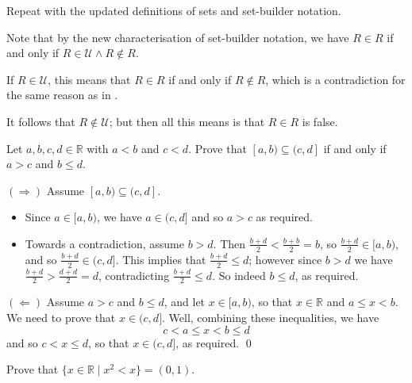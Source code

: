 \begin{exercise}
Repeat  with the updated definitions of sets and set-builder notation.
\end{exercise}

\begin{solutions*}
Note that by the new characterisation of set-builder notation, we have $R \in R$ if and only if $R \in \mathcal{U} \wedge R \not\in R$.

If $R \in \mathcal{U}$, this means that $R \in R$ if and only if $R \not\in R$, which is a contradiction for the same reason as in .

It follows that $R \not\in \mathcal{U}$; but then all this means is that $R \in R$ is false.
\end{solutions*}


\begin{exercise}
Let $a,b,c,d \in \mathbb{R}$ with $a<b$ and $c<d$. Prove that $[a,b) \subseteq (c,d]$ if and only if $a > c$ and $b \le d$.
\end{exercise}

\begin{solutions*}
$(\Rightarrow)$ Assume $[a,b) \subseteq (c,d]$.
\begin{itemize}
\item Since $a \in [a,b)$, we have $a \in (c,d]$ and so $a > c$ as required.
\item Towards a contradiction, assume $b > d$. Then $\frac{b+d}{2} < \frac{b+b}{2} = b$, so $\frac{b+d}{2} \in [a,b)$, and so $\frac{b+d}{2} \in (c,d]$. This implies that $\frac{b+d}{2} \le d$; however since $b>d$ we have $\frac{b+d}{2} > \frac{d+d}{2} = d$, contradicting $\frac{b+d}{2} \le d$. So indeed $b \le d$, as required.
\end{itemize}
$(\Leftarrow)$ Assume $a>c$ and $b \le d$, and let $x \in [a,b)$, so that $x \in \mathbb{R}$ and $a \le x < b$. We need to prove that $x \in (c,d]$. Well, combining these inequalities, we have
\[ c < a \le x < b \le d \]
and so $c < x \le d$, so that $x \in (c,d]$, as required. \qed
\end{solutions*}


\begin{exercise}
Prove that $\{ x \in \mathbb{R} \mid x^2 < x \} = (0,1)$.
\end{exercise}

